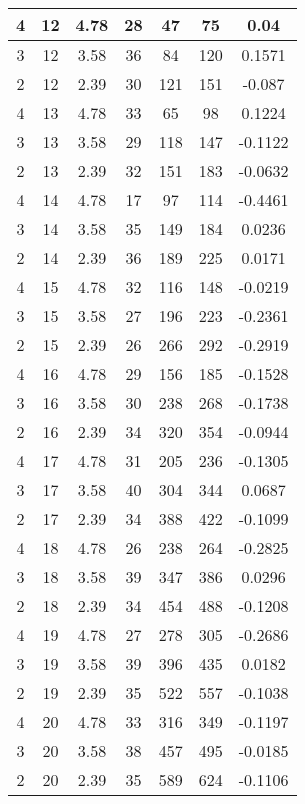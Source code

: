 \documentclass[letterpaper, 12pt]{article}
\begin{document}
\begin{longtable}{|c|c|c|c|c|c|c|}
\hline
4 & 12 & 4.78 & 28 & 47 & 75 & 0.04 \\
\hline
3 & 12 & 3.58 & 36 & 84 & 120 & 0.1571 \\
\hline
2 & 12 & 2.39 & 30 & 121 & 151 & -0.087 \\
\hline
4 & 13 & 4.78 & 33 & 65 & 98 & 0.1224 \\
\hline
3 & 13 & 3.58 & 29 & 118 & 147 & -0.1122 \\
\hline
2 & 13 & 2.39 & 32 & 151 & 183 & -0.0632 \\
\hline
4 & 14 & 4.78 & 17 & 97 & 114 & -0.4461 \\
\hline
3 & 14 & 3.58 & 35 & 149 & 184 & 0.0236 \\
\hline
2 & 14 & 2.39 & 36 & 189 & 225 & 0.0171 \\
\hline
4 & 15 & 4.78 & 32 & 116 & 148 & -0.0219 \\
\hline
3 & 15 & 3.58 & 27 & 196 & 223 & -0.2361 \\
\hline
2 & 15 & 2.39 & 26 & 266 & 292 & -0.2919 \\
\hline
4 & 16 & 4.78 & 29 & 156 & 185 & -0.1528 \\
\hline
3 & 16 & 3.58 & 30 & 238 & 268 & -0.1738 \\
\hline
2 & 16 & 2.39 & 34 & 320 & 354 & -0.0944 \\
\hline
4 & 17 & 4.78 & 31 & 205 & 236 & -0.1305 \\
\hline
3 & 17 & 3.58 & 40 & 304 & 344 & 0.0687 \\
\hline
2 & 17 & 2.39 & 34 & 388 & 422 & -0.1099 \\
\hline
4 & 18 & 4.78 & 26 & 238 & 264 & -0.2825 \\
\hline
3 & 18 & 3.58 & 39 & 347 & 386 & 0.0296 \\
\hline
2 & 18 & 2.39 & 34 & 454 & 488 & -0.1208 \\
\hline
4 & 19 & 4.78 & 27 & 278 & 305 & -0.2686 \\
\hline
3 & 19 & 3.58 & 39 & 396 & 435 & 0.0182 \\
\hline
2 & 19 & 2.39 & 35 & 522 & 557 & -0.1038 \\
\hline
4 & 20 & 4.78 & 33 & 316 & 349 & -0.1197 \\
\hline
3 & 20 & 3.58 & 38 & 457 & 495 & -0.0185 \\
\hline
2 & 20 & 2.39 & 35 & 589 & 624 & -0.1106 \\
\hline
\end{longtable}
\end{document}
